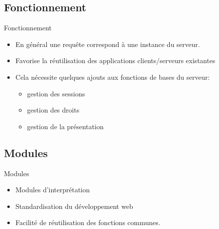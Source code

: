 \begin{frame}{\sectitle}
    \def\subsectitle{Fonctionnement}
    \subsection{\subsectitle}
    \begin{block}{\subsectitle}
        \begin{itemize}
            \item En général une requête correspond à une instance du serveur.
            \item Favorise la réutilisation des applications clients/serveurs
                existantes
            \item Cela nécessite quelques ajouts aux fonctions de bases du
                serveur:
                \begin{itemize}
                    \item gestion des sessions
                    \item gestion des droits
                    \item gestion de la présentation
                \end{itemize}
        \end{itemize}
    \end{block}
\end{frame}


\begin{frame}{\sectitle}
    \def\subsectitle{Modules}
    \subsection{\subsectitle}
    \begin{block}{\subsectitle}
        \begin{itemize}
            \item Modules d'interprétation
            \item Standardisation du développement web
            \item Facilité de réutilisation des fonctions communes.
        \end{itemize}
    \end{block}
\end{frame}


\def\sectitle{Common GateWay Interface}
